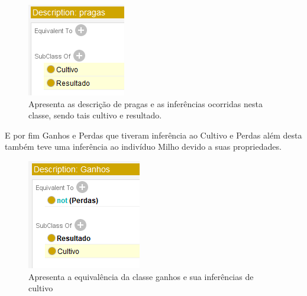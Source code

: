 \documentclass{article}
\begin{document}
    \begin{figure}[!htp]
        \centering %
        \includegraphics[width=.5\textwidth]{imagens/Inf_8.png} %
        \caption{Apresenta as descrição de pragas e as inferências ocorridas nesta classe, sendo tais cultivo e resultado.}
        \label{figura:descPragas}
    \end{figure}
    
    E por fim Ganhos e Perdas que tiveram inferência ao Cultivo e Perdas além desta também teve uma inferência ao indivíduo Milho devido a suas propriedades.
    
    \begin{figure}[!htp]
        \centering %
        \includegraphics[width=.5\textwidth]{imagens/Inf_9.png} %
        \caption{Apresenta a equivalência da classe ganhos e sua inferências de cultivo}
        \label{figura:descGanhos}
    \end{figure}
    
\end{document}
